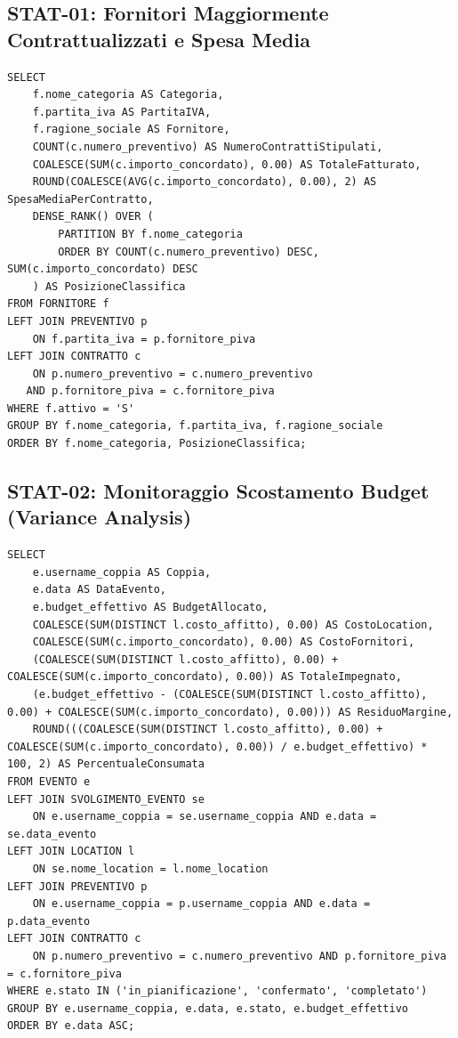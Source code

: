 \subsection{STAT-01: Fornitori Maggiormente Contrattualizzati e Spesa Media}
\begin{lstlisting}
SELECT 
    f.nome_categoria AS Categoria,
    f.partita_iva AS PartitaIVA,
    f.ragione_sociale AS Fornitore,
    COUNT(c.numero_preventivo) AS NumeroContrattiStipulati,
    COALESCE(SUM(c.importo_concordato), 0.00) AS TotaleFatturato,
    ROUND(COALESCE(AVG(c.importo_concordato), 0.00), 2) AS SpesaMediaPerContratto,
    DENSE_RANK() OVER (
        PARTITION BY f.nome_categoria 
        ORDER BY COUNT(c.numero_preventivo) DESC, SUM(c.importo_concordato) DESC
    ) AS PosizioneClassifica
FROM FORNITORE f
LEFT JOIN PREVENTIVO p 
    ON f.partita_iva = p.fornitore_piva
LEFT JOIN CONTRATTO c 
    ON p.numero_preventivo = c.numero_preventivo 
   AND p.fornitore_piva = c.fornitore_piva
WHERE f.attivo = 'S'
GROUP BY f.nome_categoria, f.partita_iva, f.ragione_sociale
ORDER BY f.nome_categoria, PosizioneClassifica;
\end{lstlisting}

\subsection{STAT-02: Monitoraggio Scostamento Budget (Variance Analysis)}
\begin{lstlisting}
SELECT 
    e.username_coppia AS Coppia,
    e.data AS DataEvento,
    e.budget_effettivo AS BudgetAllocato,
    COALESCE(SUM(DISTINCT l.costo_affitto), 0.00) AS CostoLocation,
    COALESCE(SUM(c.importo_concordato), 0.00) AS CostoFornitori,
    (COALESCE(SUM(DISTINCT l.costo_affitto), 0.00) + COALESCE(SUM(c.importo_concordato), 0.00)) AS TotaleImpegnato,
    (e.budget_effettivo - (COALESCE(SUM(DISTINCT l.costo_affitto), 0.00) + COALESCE(SUM(c.importo_concordato), 0.00))) AS ResiduoMargine,
    ROUND(((COALESCE(SUM(DISTINCT l.costo_affitto), 0.00) + COALESCE(SUM(c.importo_concordato), 0.00)) / e.budget_effettivo) * 100, 2) AS PercentualeConsumata
FROM EVENTO e
LEFT JOIN SVOLGIMENTO_EVENTO se 
    ON e.username_coppia = se.username_coppia AND e.data = se.data_evento
LEFT JOIN LOCATION l 
    ON se.nome_location = l.nome_location
LEFT JOIN PREVENTIVO p 
    ON e.username_coppia = p.username_coppia AND e.data = p.data_evento
LEFT JOIN CONTRATTO c 
    ON p.numero_preventivo = c.numero_preventivo AND p.fornitore_piva = c.fornitore_piva
WHERE e.stato IN ('in_pianificazione', 'confermato', 'completato')
GROUP BY e.username_coppia, e.data, e.stato, e.budget_effettivo
ORDER BY e.data ASC;
\end{lstlisting}
